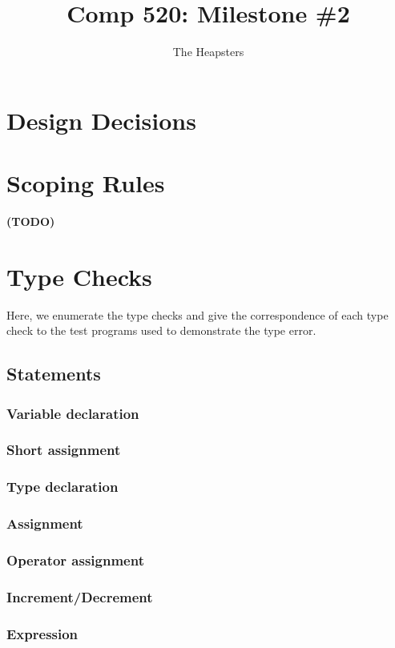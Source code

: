 \documentclass{article}
\title{Comp 520: Milestone \#2}
\author{The Heapsters}
\date{}
\begin{document}
\maketitle

\section*{Design Decisions}

\section*{Scoping Rules}

\textbf{(TODO)}

\section*{Type Checks}

Here, we enumerate the type checks and give the correspondence of each type check to the test programs used to demonstrate the type error.

\subsection*{Statements}

\subsubsection*{Variable declaration}
\subsubsection*{Short assignment}
\subsubsection*{Type declaration}
\subsubsection*{Assignment}
\subsubsection*{Operator assignment}
\subsubsection*{Increment/Decrement}
\subsubsection*{Expression}
\end{document}
